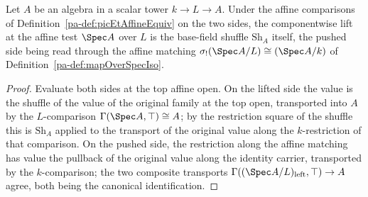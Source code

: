 \begin{theorem}
  \label{pa-thm:picEtAffineEquiv_picEtCrossBase}
  \leanok

  Let \(A\) be an algebra in a scalar tower \(k \to L \to A\).  Under the affine
  comparisons of Definition~\ref{pa-def:picEtAffineEquiv} on the two sides, the
  componentwise lift at the affine test \(\Spec A\) over \(L\) is the base-field
  shuffle \(\mathrm{Sh}_A\) itself, the pushed side being read through the affine
  matching \(\sigma_{!}(\Spec A / L) \cong (\Spec A / k)\) of
  Definition~\ref{pa-def:mapOverSpecIso}.
\end{theorem}
\begin{proof}
  \leanok
  Evaluate both sides at the top affine open.  On the lifted side the value is the
  shuffle of the value of the original family at the top open, transported into \(A\)
  by the \(L\)-comparison \(\Gamma(\Spec A, \top) \cong A\); by the restriction square
  of the shuffle this is \(\mathrm{Sh}_A\) applied to the transport of the original
  value along the \(k\)-restriction of that comparison.  On the pushed side, the
  restriction along the affine matching has value the pullback of the original value
  along the identity carrier, transported by the \(k\)-comparison; the two composite
  transports \(\Gamma((\Spec A/L)_{\mathrm{left}}, \top) \to A\) agree, both being the
  canonical identification.
\end{proof}

